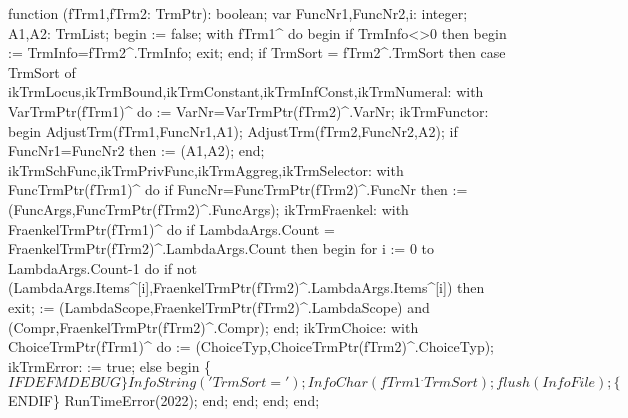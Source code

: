 function (fTrm1,fTrm2: TrmPtr): boolean;
var
   FuncNr1,FuncNr2,i: integer;
   A1,A2: TrmList;
begin
    := false;
   with fTrm1^ do
   begin
      if TrmInfo<>0 then
      begin
          := TrmInfo=fTrm2^.TrmInfo;
         exit;
      end;
      if TrmSort = fTrm2^.TrmSort then
         case TrmSort of
            ikTrmLocus,ikTrmBound,ikTrmConstant,ikTrmInfConst,ikTrmNumeral:
               with VarTrmPtr(fTrm1)^ do
                   := VarNr=VarTrmPtr(fTrm2)^.VarNr;
            ikTrmFunctor:
               begin
                  AdjustTrm(fTrm1,FuncNr1,A1);
                  AdjustTrm(fTrm2,FuncNr2,A2);
                  if FuncNr1=FuncNr2 then  := (A1,A2);
               end;
            ikTrmSchFunc,ikTrmPrivFunc,ikTrmAggreg,ikTrmSelector:
               with FuncTrmPtr(fTrm1)^ do
                  if FuncNr=FuncTrmPtr(fTrm2)^.FuncNr then
                      := (FuncArgs,FuncTrmPtr(fTrm2)^.FuncArgs);
            ikTrmFraenkel:
               with FraenkelTrmPtr(fTrm1)^ do
                  if LambdaArgs.Count = FraenkelTrmPtr(fTrm2)^.LambdaArgs.Count then
                  begin
                     for i := 0 to LambdaArgs.Count-1 do
                        if not (LambdaArgs.Items^[i],FraenkelTrmPtr(fTrm2)^.LambdaArgs.Items^[i]) then
                           exit;
                      := (LambdaScope,FraenkelTrmPtr(fTrm2)^.LambdaScope)
                        and (Compr,FraenkelTrmPtr(fTrm2)^.Compr);
                  end;
            ikTrmChoice:
               with ChoiceTrmPtr(fTrm1)^ do
                := (ChoiceTyp,ChoiceTrmPtr(fTrm2)^.ChoiceTyp);
            ikTrmError:  := true;
         else
         begin
            \{$IFDEF MDEBUG\}
            InfoString('TrmSort='); InfoChar(fTrm1^.TrmSort); flush(InfoFile);
            \{$ENDIF\}
            RunTimeError(2022);
         end;
         end;
   end;
end;
\eatline
{}\nwendcode{}\nwdocspar
